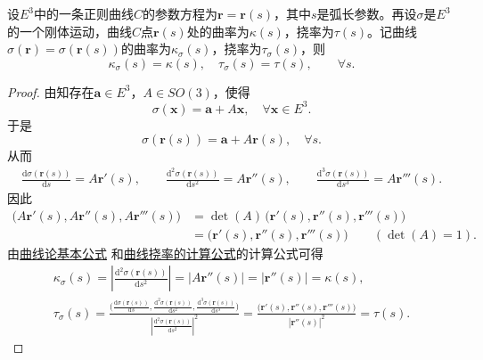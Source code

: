 \documentclass[../../main.tex]{subfiles}%
\begin{document}
\begin{proposition}\label{proposition:曲线的曲率和挠率在刚体运动下不变}
设$E^3$中的一条正则曲线$C$的参数方程为$\bm{r}=\bm{r}(s)$，其中$s$是弧长参数。再设$\sigma$是$E^3$的一个刚体运动，曲线$C$点$\bm{r}(s)$处的曲率为$\kappa(s)$，挠率为$\tau(s)$。记曲线$\sigma(\bm{r})=\sigma(\bm{r}(s))$的曲率为$\kappa_{\sigma}(s)$，挠率为$\tau_{\sigma}(s)$，则
\[
\kappa_{\sigma}(s)=\kappa(s),\quad \tau_{\sigma}(s)=\tau(s),\qquad \forall s.
\]
\end{proposition}
\begin{proof}

由知存在$\bm{a}\in E^3$，$A\in SO(3)$，使得
\[
\sigma(\bm{x})=\bm{a}+A\bm{x},\quad \forall \bm{x}\in E^3.
\]
于是
\[
\sigma(\bm{r}(s))=\bm{a}+A\bm{r}(s),\quad \forall s.
\]
从而
\begin{align*}
\frac{\mathrm{d}\sigma(\bm{r}(s))}{\mathrm{d}s}=A\bm{r}'(s),\qquad 
\frac{\mathrm{d}^2\sigma(\bm{r}(s))}{\mathrm{d}s^2}=A\bm{r}''(s),\qquad 
\frac{\mathrm{d}^3\sigma(\bm{r}(s))}{\mathrm{d}s^3}=A\bm{r}'''(s).
\end{align*}
因此
\begin{align*}
\bigl(A\bm{r}'(s),A\bm{r}''(s),A\bm{r}'''(s)\bigr)
&=\det(A)\,\bigl(\bm{r}'(s),\bm{r}''(s),\bm{r}'''(s)\bigr) \\
&=\bigl(\bm{r}'(s),\bm{r}''(s),\bm{r}'''(s)\bigr) \qquad (\det(A)=1).
\end{align*}
由\hyperref[theorem:曲线论基本公式]{曲线论基本公式}
和\hyperref[theorem:微分几何-曲线挠率的计算公式]{曲线挠率的计算公式}的计算公式可得
\begin{gather*}
\kappa_{\sigma}(s)=\left|\frac{\mathrm{d}^2\sigma(\bm{r}(s))}{\mathrm{d}s^2}\right|
=|A\bm{r}''(s)|=|\bm{r}''(s)|=\kappa(s),\\
\tau_{\sigma}(s)=\frac{\bigl(\frac{\mathrm{d}\sigma(\bm{r}(s))}{\mathrm{d}s},\frac{\mathrm{d}^2\sigma(\bm{r}(s))}{\mathrm{d}s^2},\frac{\mathrm{d}^3\sigma(\bm{r}(s))}{\mathrm{d}s^3}\bigr)}
{\left|\frac{\mathrm{d}^2\sigma(\bm{r}(s))}{\mathrm{d}s^2}\right|^2}
=\frac{\bigl(\bm{r}'(s),\bm{r}''(s),\bm{r}'''(s)\bigr)}{|\bm{r}''(s)|^2}
=\tau(s).
\end{gather*}

\end{proof}
\end{document}
